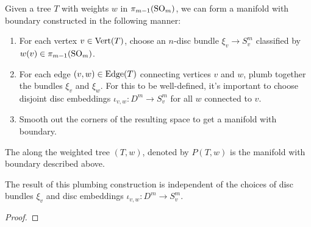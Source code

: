 \begin{figure}[ht]
	\vspace{1em}
	\caption{}
\end{figure}

Given a tree $T$ with weights $w$ in $\pi_{m-1}({\operatorname{SO}}_m)$, we can form a manifold with boundary constructed in the following manner:
\begin{enumerate}
	\item For each vertex $v\in {\operatorname{Vert}}(T)$, choose an $n$-disc bundle $\xi_v\to S^m_v$ classified by $w(v)\in \pi_{m-1}({\operatorname{SO}}_m)$.
	\item For each edge $(v,w)\in {\operatorname{Edge}}(T)$ connecting vertices $v$ and $w$, plumb together the bundles $\xi_v$ and $\xi_w$. For this to be well-defined, it's important to choose disjoint disc embeddings $\iota_{v,w} : D^m \to S^m_v$ for all $w$ connected to $v$.
	\item Smooth out the corners of the resulting space to get a manifold with boundary.
\end{enumerate}
\begin{definition}
	The  along the weighted tree $(T,w)$, denoted by $P(T,w)$ is the manifold with boundary described above.
\end{definition}

\begin{theorem}
	The result of this plumbing construction is independent of the choices of disc bundles $\xi_v$ and disc embeddings $\iota_{v,w} : D^m \to S^m_v$.
\end{theorem}

\begin{proof}
\end{proof}

